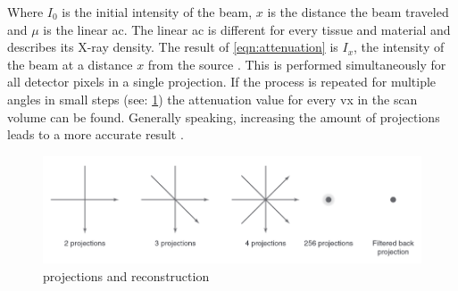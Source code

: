 \noindent
Where $I_{0}$ is the initial intensity of the beam, $x$ is the distance the beam traveled and $\mu$ is the linear \acrlong{ac}.
The linear \acrfull{ac} is different for every tissue and material and describes its X-ray density.
The result of \cref{eqn:attenuation} is $I_{x}$, the intensity of the beam at a distance $x$ from the source \cite{liMicrocomputedTomographySmall2008,orhanMicrocomputedTomographyMicroCT2020}.
This is performed simultaneously for all detector pixels in a single projection.
If the process is repeated for multiple angles in small steps (see: \cref{fig:ct-projections}) the attenuation value for every \gls{vx} in the scan volume can be found.
Generally speaking, increasing the amount of projections leads to a more accurate result \cite{liMicrocomputedTomographySmall2008,orhanMicrocomputedTomographyMicroCT2020}.
\begin{figure}[h]
	\centerline{
		\includegraphics[scale=0.5]{images/ct-projections.png}}
	\caption{\mct\space projections and reconstruction \cite{orhanMicrocomputedTomographyMicroCT2020}}\label{fig:ct-projections}
\end{figure}


